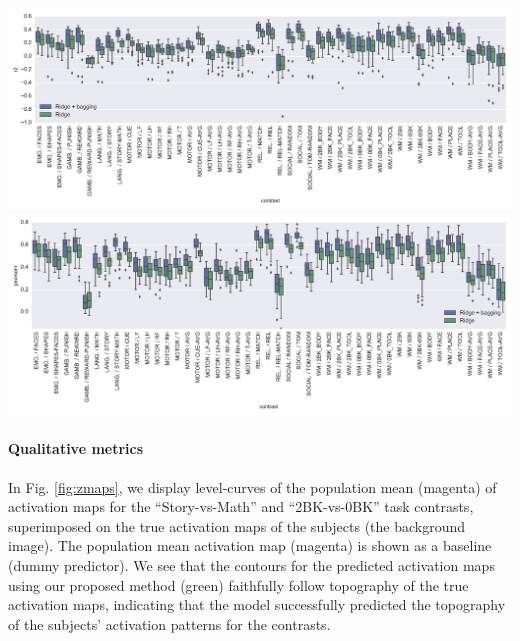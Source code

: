 \begin{pagefigure}%
  \includegraphics[width=1\linewidth]{figures/r2_scores.pdf}
  \includegraphics[width=1\linewidth]{figures/pearsonr_scores.pdf}
  \caption{\textbf{Top:}
    Confusion matrices for predicted versus true activation maps for
    the ``Story vs Math'' task contrast. The left plot corresponds to the reference
    method\citep{tavor2016task} while the right one is for our proposed method.
      Higher diagonal values is better.
      The strong diagonal dorminance of these matrices reveals that the predicted maps of the subjects are more similar to their true maps than to other subjects. \textbf{Bottom:}
      Percentage gain (the higher the better) in average diagonal
      to average off-diagonal
      of Fig \ref{fig:conf}. Results for the reference method \citep{tavor2016task} are also shown.      
    }
    \label{fig:conf}
  \end{pagefigure}

\paragraph{Qualitative metrics} In Fig. \ref{fig:zmaps}, we display level-curves of the population mean (magenta) of
activation maps for the ``Story-vs-Math'' and ``2BK-vs-0BK'' task contrasts, superimposed on the true activation maps of the
subjects (the background image).  The population mean activation map (magenta) is shown as a baseline (dummy predictor).
We see that the contours for the predicted activation maps using our proposed method (green)
faithfully follow topography of the true activation maps, indicating that the model successfully
predicted the topography of the subjects' activation patterns for the contrasts.

